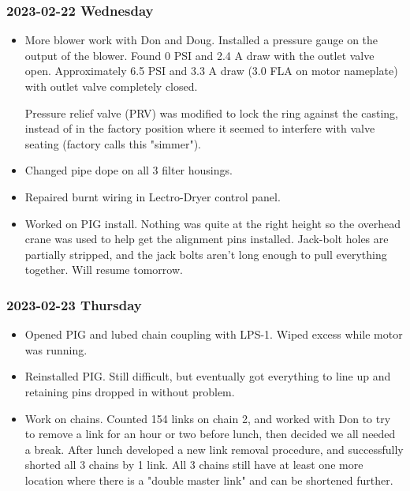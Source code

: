 \documentclass{scrartcl}
\begin{document}
\subsubsection{2023-02-22 Wednesday}
\begin{itemize}
	\item More blower work with Don and Doug.  Installed a pressure gauge
	on the output of the blower. Found 0 PSI and 2.4 A draw with the outlet
	valve open.  Approximately 6.5 PSI and 3.3 A draw (3.0 FLA on motor
	nameplate) with outlet valve completely closed.  \par
	Pressure relief valve (PRV) was modified to lock the ring against the
	casting, instead of in the factory position where it seemed to
	interfere with valve seating (factory calls this "simmer").
	\item Changed pipe dope on all 3 filter housings.  
	\item Repaired burnt wiring in Lectro-Dryer control panel.  
	\item Worked on PIG install.  Nothing was quite at the right height
	so the overhead crane was used to help get the alignment pins installed.
	Jack-bolt holes are partially stripped, and the jack bolts aren't long
	enough to pull everything together.  Will resume tomorrow.
\end{itemize}

\subsubsection{2023-02-23 Thursday}
\begin{itemize}
	\item Opened PIG and lubed chain coupling with LPS-1.  Wiped excess 
	while motor was running.
	\item Reinstalled PIG.  Still difficult, but eventually got
	everything to line up and retaining pins dropped in without problem.
	\item Work on chains.  Counted 154 links on chain 2, and worked with Don
	to try to remove a link for an hour or two before lunch, then decided
	we all needed a break.  After lunch developed a new link removal 
	procedure, and successfully shorted all 3 chains by 1 link.  All 3
	chains still have at least one more location where there is a 
	"double master link" and can be shortened further.
\end{itemize}
\end{document}
